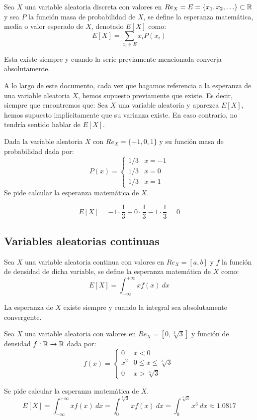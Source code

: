 \begin{definicion}
    Sea $X$ una variable aleatoria discreta con valores en $Re_X = E = \{x_1, x_2, \ldots\} \subset \mathbb R$ y sea $P$ la función masa de probabilidad de $X$, se define la esperanza matemática, media o valor esperado de $X$, denotado $E[X]$ como:
    $$E[X] = \sum\limits_{x_i \in E} x_i P(x_i)$$

    Esta existe siempre y cuando la serie previamente mencionada converja absolutamente.
\end{definicion}
\begin{observacion}
    A lo largo de este documento, cada vez que hagamos referencia a la esperanza de una variable aleatoria $X$, hemos supuesto previamente que existe. Es decir, siempre que encontremos que: Sea $X$ una variable aleatoria y aparezca $E[X]$, hemos supuesto implícitamente que su varianza existe. En caso contrario, no tendría sentido hablar de $E[X]$.
\end{observacion}

\begin{ejemplo}
    Dada la variable aleatoria $X$ con $Re_X = \{-1, 0, 1\}$ y su función masa de probabilidad dada por:
    $$P(x) = \left\{ \begin{array}{cl}
        1/3 & x = -1 \\
        1/3 & x = 0  \\
        1/3 & x = 1
      \end{array} \right.$$
    Se pide calcular la esperanza matemática de $X$.
    
    $$E[X] = -1 \cdot \dfrac{1}{3} + 0 \cdot \dfrac{1}{3} -1 \cdot \dfrac{1}{3} = 0$$
\end{ejemplo}

\subsection{Variables aleatorias continuas}

\begin{definicion}
    Sea $X$ una variable aleatoria continua con valores en $Re_X = [a,b]$ y $f$ la función de densidad de dicha variable, se define la esperanza matemática de $X$ como:
    $$E[X] = \int_{-\infty}^{+\infty} xf(x)~dx$$

    La esperanza de $X$ existe siempre y cuando la integral sea absolutamente convergente.
\end{definicion}

\begin{ejemplo}
    Sea $X$ una variable aleatoria con valores en $Re_X = [0, \sqrt[3]{3}]$ y función de densidad $f:\mathbb R \rightarrow \mathbb R$ dada por:
    $$f(x) = \left\{ \begin{array}{ll}
        0   & x < 0                     \\
        x^2 & 0 \leq x \leq \sqrt[3]{3} \\
        0   & x > \sqrt[3]{3}
    \end{array} \right.$$
    
    
    Se pide calcular la esperanza matemática de $X$.
    $$E[X] = \int_{-\infty}^{+\infty} xf(x)~dx = \int_0^{\sqrt[3]{3}} xf(x)~dx = \int_0^{\sqrt[3]{3}} x^3~dx \approx 1.0817$$
\end{ejemplo}


